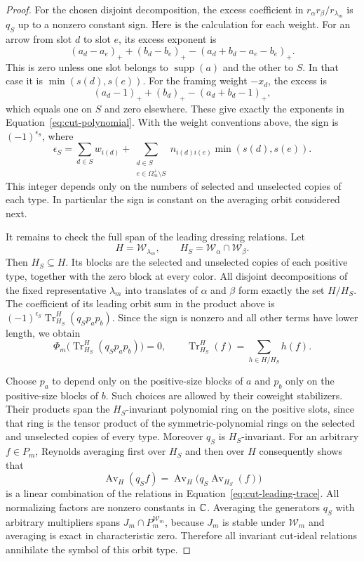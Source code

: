 \begin{proof}
For the chosen disjoint decomposition, the excess coefficient in
$r_\alpha r_\beta/r_{\lambda_m}$ is $q_S$ up to a nonzero constant
sign.  Here is the calculation for each weight.  For an arrow from
slot $d$ to slot $e$, its excess exponent is
\[
 (a_d-a_e)_+ +(b_d-b_e)_+
                  -(a_d+b_d-a_e-b_e)_+.
\]
This is zero unless one slot belongs to $\operatorname{supp}(a)$ and
the other to $S$.  In that case it is
$\min(s(d),s(e))$.  For the framing weight $-x_d$, the excess is
\[
 (a_d-1)_+ +(b_d)_+ -(a_d+b_d-1)_+,
\]
which equals one on $S$ and zero elsewhere.  These give exactly the
exponents in Equation~\eqref{eq:cut-polynomial}.  With the weight
conventions above, the sign is $(-1)^{\epsilon_S}$, where
\[
 \epsilon_S=
 \sum_{d\in S}w_{i(d)}+
 \sum_{\substack{d\in S\\e\in\Omega_m^+\setminus S}}
 n_{i(d)i(e)}\min(s(d),s(e)).
\]
This integer depends only on the numbers of selected and unselected
copies of each type.  In particular the sign is constant on the
averaging orbit considered next.

It remains to check the full span of the leading dressing relations.
Let
\[
 H=\mathcal W_{\lambda_m},\qquad
 H_S=\mathcal W_\alpha\cap\mathcal W_\beta.
\]
Then $H_S\subseteq H$.  Its blocks are the selected and unselected
copies of each positive type, together with the zero block at every
color.  All disjoint decompositions of the fixed representative
$\lambda_m$ into translates of $\alpha$ and $\beta$ form exactly the
set $H/H_S$.  The coefficient of its leading orbit sum in the product
above is $(-1)^{\epsilon_S}\operatorname{Tr}_{H_S}^H(q_Sp_ap_b)$.
Since the sign is nonzero and all other terms have lower length, we
obtain
\begin{equation}\label{eq:cut-leading-trace}
 \Phi_m\bigl(\operatorname{Tr}_{H_S}^H(q_Sp_ap_b)\bigr)=0,
 \qquad
 \operatorname{Tr}_{H_S}^H(f)=\sum_{h\in H/H_S}h(f).
\end{equation}

Choose $p_a$ to depend only on the positive-size blocks of $a$ and
$p_b$ only on the positive-size blocks of $b$.  Such choices are
allowed by their coweight stabilizers.  Their products span the
$H_S$-invariant polynomial ring on the positive slots, since that ring
is the tensor product of the symmetric-polynomial rings on the
selected and unselected copies of every type.  Moreover $q_S$ is
$H_S$-invariant.  For an arbitrary $f\in P_m$, Reynolds averaging first
over $H_S$ and then over $H$ consequently shows that
\[
 \operatorname{Av}_H(q_S f)
 =\operatorname{Av}_H\bigl(q_S\operatorname{Av}_{H_S}(f)\bigr)
\]
is a linear combination of the relations in
Equation~\eqref{eq:cut-leading-trace}.  All normalizing factors are
nonzero constants in $\mathbb C$.  Averaging the generators $q_S$ with
arbitrary multipliers spans $J_m\cap P_m^{\mathcal W_m}$, because
$J_m$ is stable under $\mathcal W_m$ and averaging is exact in
characteristic zero.  Therefore all invariant cut-ideal relations
annihilate the symbol of this orbit type.


\end{proof}
